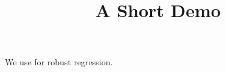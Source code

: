\documentclass[article]{jss}
\title{A Short Demo}
\begin{document}
We use  for robust regression.
\end{document}
